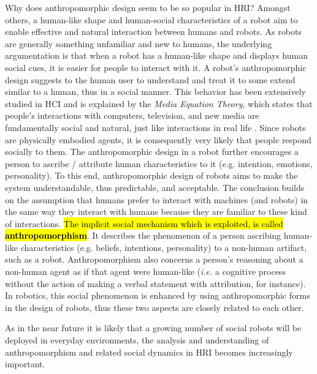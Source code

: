 \documentclass[twocolumn]{svjour3}          %
\begin{document}
     Why does anthropomorphic design seem to be so popular in HRI? Amongst others, a human-like shape and human-social characteristics of a robot aim to enable effective and natural interaction between humans and robots. As robots are generally something unfamiliar and new to humans, the underlying argumentation is that when a robot has a human-like shape and displays human social cues, it is easier for people to interact with it. A robot's anthropomorphic design suggests to the human user to understand and treat it to some extend similar to a human, thus in a social manner. This behavior has been extensively studied in HCI and is explained by the \emph{Media Equation Theory}, which states that people's interactions with computers, television, and new media are fundamentally social and natural, just like interactions in real life \cite{reeves_media_1996}. Since robots are physically embodied agents, it is consequently very likely that people respond socially to them. The anthropomorphic design in a robot further encourages a person to ascribe / attribute human characteristics to it (e.g. intention, emotions, personality). To this end, anthropomorphic design of robots aims to make the system understandable, thus predictable, and acceptable. The conclusion builds on the assumption that humans prefer to interact with machines (and robots) in the same way they interact with humans \cite{fong_survey_2003} because they are familiar to these kind of interactions. \hl{The implicit social mechanism which is exploited, is called \textbf{anthropomorphism}}. It describes the phenomenon of a person ascribing human-like characteristics (e.g. beliefs, intentions, personality) to a non-human artifact, such as a robot. Anthropomorphism also concerns a person's reasoning about a non-human agent as if that agent were human-like (\textit{i.e.} a cognitive process without the action of making a verbal statement with attribution, for instance). In robotics, this social phenomenon is enhanced by using anthropomorphic forms in the design of robots, thus these two aspects are closely related to each other. 
	
	As in the near future it is likely that a growing number of social robots will be deployed in everyday environments, the analysis and understanding of anthropomorphism and related social dynamics in HRI becomes increasingly important.
	
%
%
%
%
%
%
\end{document}
